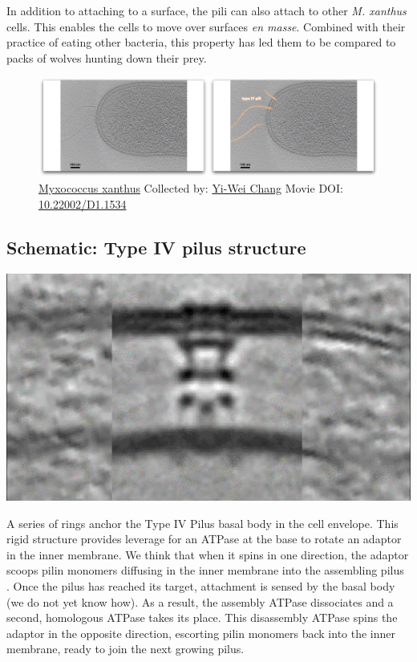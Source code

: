 \documentclass[]{tufte-book}
\begin{document}
In addition to attaching to a surface, the pili can also attach to other
\emph{M. xanthus} cells. This enables the cells to move over surfaces
\emph{en masse}. Combined with their practice of eating other bacteria,
this property has led them to be compared to packs of wolves hunting
down their prey.





\begin{figure}
\includegraphics{movie_stills/6_10} \caption[\protect\hyperlink{tree}{Myxococcus xanthus} Collected by:
\protect\hyperlink{yi-wei_chang}{Yi-Wei Chang} Movie DOI:
\href{https://doi.org/10.22002/D1.1534}{10.22002/D1.1534}]{\protect\hyperlink{tree}{Myxococcus xanthus} Collected by:
\protect\hyperlink{yi-wei_chang}{Yi-Wei Chang} Movie DOI:
\href{https://doi.org/10.22002/D1.1534}{10.22002/D1.1534}}\label{fig:6-10}
\end{figure}

\hypertarget{Type_IV_pilus_structure}{\subsection*{Schematic: Type IV
pilus structure}\label{Type_IV_pilus_structure}}

\includegraphics{img/schematics/6_10_1}

A series of rings anchor the Type IV Pilus basal body in the cell
envelope. This rigid structure provides leverage for an ATPase at the
base to rotate an adaptor in the inner membrane. We think that when it
spins in one direction, the adaptor scoops pilin monomers diffusing in
the inner membrane into the assembling pilus \citep{chang2016}. Once the
pilus has reached its target, attachment is sensed by the basal body (we
do not yet know how). As a result, the assembly ATPase dissociates and a
second, homologous ATPase takes its place. This disassembly ATPase spins
the adaptor in the opposite direction, escorting pilin monomers back
into the inner membrane, ready to join the next growing pilus.
\end{document}
